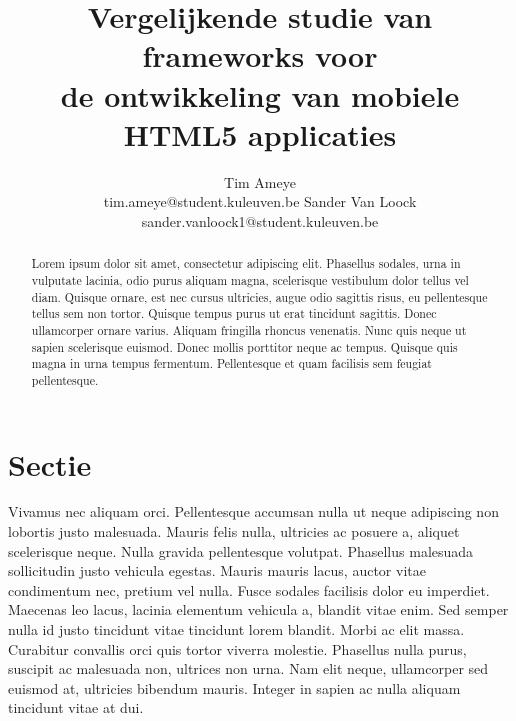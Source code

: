 \documentclass[a4paper]{article}
\title{Vergelijkende studie van frameworks voor \\ de ontwikkeling van mobiele HTML5 applicaties}
\author{Tim Ameye \\ tim.ameye@student.kuleuven.be \And Sander Van Loock \\ sander.vanloock1@student.kuleuven.be}
\begin{document}
\maketitle

\begin{abstract}
Lorem ipsum dolor sit amet, consectetur adipiscing elit. Phasellus sodales, urna in vulputate lacinia, odio purus aliquam magna, scelerisque vestibulum dolor tellus vel diam. Quisque ornare, est nec cursus ultricies, augue odio sagittis risus, eu pellentesque tellus sem non tortor. Quisque tempus purus ut erat tincidunt sagittis. Donec ullamcorper ornare varius. Aliquam fringilla rhoncus venenatis. Nunc quis neque ut sapien scelerisque euismod. Donec mollis porttitor neque ac tempus. Quisque quis magna in urna tempus fermentum. Pellentesque et quam facilisis sem feugiat pellentesque.
\end{abstract}

\section{Sectie}
Vivamus nec aliquam orci. Pellentesque accumsan nulla ut neque adipiscing non lobortis justo malesuada. Mauris felis nulla, ultricies ac posuere a, aliquet scelerisque neque. Nulla gravida pellentesque volutpat. Phasellus malesuada sollicitudin justo vehicula egestas. Mauris mauris lacus, auctor vitae condimentum nec, pretium vel nulla. Fusce sodales facilisis dolor eu imperdiet. Maecenas leo lacus, lacinia elementum vehicula a, blandit vitae enim. Sed semper nulla id justo tincidunt vitae tincidunt lorem blandit. Morbi ac elit massa. Curabitur convallis orci quis tortor viverra molestie. Phasellus nulla purus, suscipit ac malesuada non, ultrices non urna. Nam elit neque, ullamcorper sed euismod at, ultricies bibendum mauris. Integer in sapien ac nulla aliquam tincidunt vitae at dui.



\end{document}
